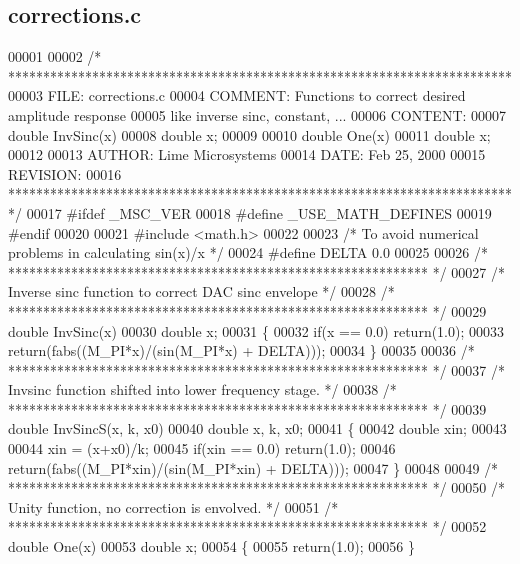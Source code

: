 \subsection{corrections.\+c}
\label{corrections_8c_source}

\begin{DoxyCode}
00001 
00002 \textcolor{comment}{/* ************************************************************************}
00003 \textcolor{comment}{   FILE:        corrections.c}
00004 \textcolor{comment}{   COMMENT:     Functions to correct desired amplitude response}
00005 \textcolor{comment}{        like inverse sinc, constant, ...}
00006 \textcolor{comment}{   CONTENT:}
00007 \textcolor{comment}{        double InvSinc(x)}
00008 \textcolor{comment}{        double x;}
00009 \textcolor{comment}{}
00010 \textcolor{comment}{        double One(x)}
00011 \textcolor{comment}{        double x;}
00012 \textcolor{comment}{}
00013 \textcolor{comment}{   AUTHOR:      Lime Microsystems}
00014 \textcolor{comment}{   DATE:        Feb 25, 2000}
00015 \textcolor{comment}{   REVISION:            }
00016 \textcolor{comment}{   ************************************************************************ */}
00017 \textcolor{preprocessor}{#ifdef \_MSC\_VER}
00018 \textcolor{preprocessor}{#define \_USE\_MATH\_DEFINES}
00019 \textcolor{preprocessor}{#endif }
00020 
00021 \textcolor{preprocessor}{#include <math.h>}
00022 
00023 \textcolor{comment}{/* To avoid numerical problems in calculating sin(x)/x */}
00024 \textcolor{preprocessor}{#define DELTA   0.0}
00025 
00026 \textcolor{comment}{/* ************************************************************ */}
00027 \textcolor{comment}{/* Inverse sinc function to correct DAC sinc envelope       */}
00028 \textcolor{comment}{/* ************************************************************ */}
00029 \textcolor{keywordtype}{double} InvSinc(x)
00030 double x;
00031 \{
00032     \textcolor{keywordflow}{if}(x == 0.0) \textcolor{keywordflow}{return}(1.0);
00033     \textcolor{keywordflow}{return}(fabs((M\_PI*x)/(sin(M\_PI*x) + DELTA)));
00034 \}
00035 
00036 \textcolor{comment}{/* ************************************************************ */}
00037 \textcolor{comment}{/* Invsinc function shifted into lower frequency stage.     */}
00038 \textcolor{comment}{/* ************************************************************ */}
00039 \textcolor{keywordtype}{double} InvSincS(x, k, x0)
00040 double x, k, x0;
00041 \{
00042     \textcolor{keywordtype}{double} xin;
00043 
00044     xin = (x+x0)/k;
00045     \textcolor{keywordflow}{if}(xin == 0.0) \textcolor{keywordflow}{return}(1.0);
00046     \textcolor{keywordflow}{return}(fabs((M\_PI*xin)/(sin(M\_PI*xin) + DELTA)));
00047 \}
00048 
00049 \textcolor{comment}{/* ************************************************************ */}
00050 \textcolor{comment}{/* Unity function, no correction is envolved.           */}
00051 \textcolor{comment}{/* ************************************************************ */}
00052 \textcolor{keywordtype}{double} One(x)
00053 double x;
00054 \{
00055     \textcolor{keywordflow}{return}(1.0);
00056 \}
\end{DoxyCode}
